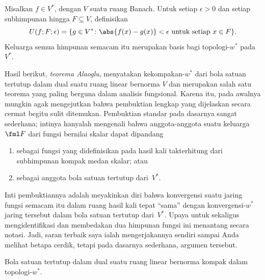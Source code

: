 \begin{prop} Misalkan $f \in V^*$, dengan $V$ suatu ruang Banach.  Untuk setiap $\epsilon > 0$ dan setiap
subhimpunan hingga $F \subseteq V$, definisikan
  \[ U(f;F;\epsilon)
           = \{g \in V^*\colon \abs{f(x) - g(x)} < \epsilon \text{ untuk setiap $x \in F$}\}. \]
Keluarga semua himpunan semacam itu merupakan basis bagi topologi-$w^*$ pada~$V^*$.
\end{prop}

Hasil berikut, \emph{teorema Alaoglu}, menyatakan kekompakan-$w^*$ dari bola satuan tertutup dalam
dual suatu ruang linear bernorma $V$ dan merupakan salah satu teorema yang paling berguna dalam analisis fungsional.  Karena itu,
pada awalnya mungkin agak mengejutkan bahwa pembuktian lengkap yang dijelaskan secara cermat
begitu sulit ditemukan.  Pembuktian standar pada dasarnya sangat sederhana; intinya hanyalah mengenali
bahwa anggota-anggota suatu keluarga $\fml F$ dari fungsi bernilai skalar dapat dipandang
  \begin{enumerate}
     \item[(i)] sebagai fungsi yang didefinisikan pada hasil kali takterhitung dari subhimpunan kompak medan skalar; atau
     \item[(ii)] sebagai anggota bola satuan tertutup dari~$V^*$.
  \end{enumerate}
Inti pembuktiannya adalah meyakinkan diri bahwa konvergensi suatu jaring fungsi semacam itu dalam ruang hasil kali
tepat ``sama'' dengan konvergensi-$w^*$ jaring tersebut dalam bola satuan tertutup dari~$V^*$.  Upaya untuk sekaligus
mengidentifikasi dan membedakan dua himpunan fungsi ini menantang secara notasi.  Jadi, saran terbaik saya ialah mengerjakannya
sendiri sampai Anda melihat betapa cerdik, tetapi pada dasarnya sederhana, argumen tersebut.

\begin{thm}\label{C067441} Bola satuan tertutup dalam dual suatu ruang linear bernorma
kompak dalam topologi-$w^*$.
\end{thm}

